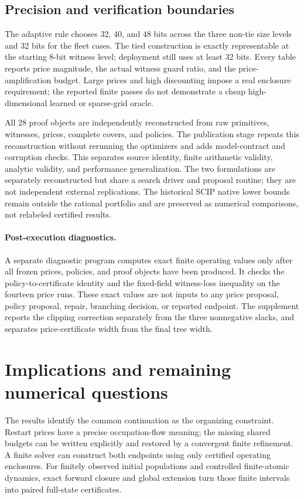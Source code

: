 \subsection{Precision and verification boundaries}
The adaptive rule chooses 32, 40, and 48 bits across the three non-tie size levels and 32 bits for the fleet cases. The tied construction is exactly representable at the starting 8-bit witness level; deployment still uses at least 32 bits. Every table reports price magnitude, the actual witness guard ratio, and the price-amplification budget. Large prices and high discounting impose a real enclosure requirement; the reported finite passes do not demonstrate a cheap high-dimensional learned or sparse-grid oracle.

All 28 proof objects are independently reconstructed from raw primitives, witnesses, prices, complete covers, and policies. The publication stage repeats this reconstruction without rerunning the optimizers and adds model-contract and corruption checks. This separates source identity, finite arithmetic validity, analytic validity, and performance generalization. The two formulations are separately reconstructed but share a search driver and proposal routine; they are not independent external replications. The historical SCIP native lower bounds remain outside the rational portfolio and are preserved as numerical comparisons, not relabeled certified results.

\paragraph{Post-execution diagnostics.}
A separate diagnostic program computes exact finite operating values only after
all frozen prices, policies, and proof objects have been produced. It checks the
policy-to-certificate identity and the fixed-field witness-loss inequality on the
fourteen price runs. These exact values are not inputs to any price proposal,
policy proposal, repair, branching decision, or reported endpoint. The supplement
reports the clipping correction separately from the three nonnegative slacks,
and separates price-certificate width from the final tree width.

\section{Implications and remaining numerical questions}\label{sec:conclusion48}
The results identify the common continuation as the organizing constraint. Restart prices have a precise occupation-flow meaning; the missing shared budgets can be written explicitly and restored by a convergent finite refinement. A finite solver can construct both endpoints using only certified operating enclosures. For finitely observed initial populations and controlled finite-atomic dynamics, exact forward closure and global extension turn those finite intervals into paired full-state certificates.

